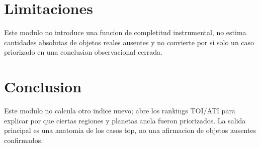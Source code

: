 \documentclass[11pt]{article}
\begin{document}
\section{Limitaciones}
Este modulo no introduce una funcion de completitud instrumental, no estima cantidades absolutas de objetos reales ausentes y no convierte por si solo un caso priorizado en una conclusion observacional cerrada.

\section{Conclusion}
Este modulo no calcula otro indice nuevo; abre los rankings TOI/ATI para explicar por que ciertas regiones y planetas ancla fueron priorizados. La salida principal es una anatomia de los casos top, no una afirmacion de objetos ausentes confirmados.
\end{document}

